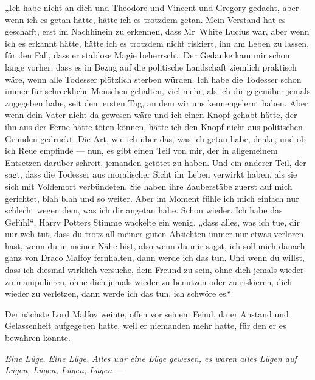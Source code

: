 „Ich habe nicht an dich und Theodore und Vincent und Gregory gedacht, aber wenn ich es getan hätte, hätte ich es trotzdem getan. Mein Verstand hat es geschafft, erst im Nachhinein zu erkennen, dass Mr~White Lucius war, aber wenn ich es erkannt hätte, hätte ich es trotzdem nicht riskiert, ihn am Leben zu lassen, für den Fall, dass er stablose Magie beherrscht. Der Gedanke kam mir schon lange vorher, dass es in Bezug auf die politische Landschaft ziemlich praktisch wäre, wenn alle Todesser plötzlich sterben würden. Ich habe die Todesser schon immer für schreckliche Menschen gehalten, viel mehr, als ich dir gegenüber jemals zugegeben habe, seit dem ersten Tag, an dem wir uns kennengelernt haben. Aber wenn dein Vater nicht da gewesen wäre und ich einen Knopf gehabt hätte, der ihn aus der Ferne hätte töten können, hätte ich den Knopf nicht aus politischen Gründen gedrückt. Die Art, wie ich über das, was ich getan habe, denke, und ob ich Reue empfinde — nun, es gibt einen Teil von mir, der in allgemeinem Entsetzen darüber schreit, jemanden getötet zu haben. Und ein anderer Teil, der sagt, dass die Todesser aus moralischer Sicht ihr Leben verwirkt haben, als sie sich mit Voldemort verbündeten. Sie haben ihre Zauberstäbe zuerst auf mich gerichtet, blah blah und so weiter. Aber im Moment fühle ich mich einfach nur schlecht wegen dem, was ich dir angetan habe. Schon wieder. Ich habe das Gefühl“, Harry Potters Stimme wackelte ein wenig, „dass alles, was ich tue, dir nur weh tut, dass du trotz all meiner guten Absichten immer nur etwas verloren hast, wenn du in meiner Nähe bist, also wenn du mir sagst, ich soll mich danach ganz von Draco Malfoy fernhalten, dann werde ich das tun. Und wenn du willst, dass ich diesmal wirklich versuche, dein Freund zu sein, ohne dich jemals wieder zu manipulieren, ohne dich jemals wieder zu benutzen oder zu riskieren, dich wieder zu verletzen, dann werde ich das tun, ich schwöre es.“

Der nächste Lord Malfoy weinte, offen vor seinem Feind, da er Anstand und Gelassenheit aufgegeben hatte, weil er niemanden mehr hatte, für den er es bewahren konnte.

\emph{Eine Lüge. Eine Lüge. Alles war eine Lüge gewesen, es waren alles Lügen auf Lügen, Lügen, Lügen, Lügen —}

